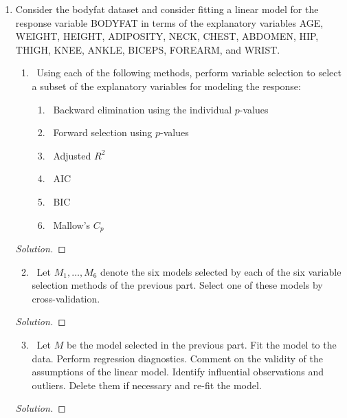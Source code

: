 \documentclass[12pt]{article}
\begin{document}
\begin{enumerate}[leftmargin=0cm,itemindent=.5cm,labelwidth=\itemindent,labelsep=0cm,align=left]

\item Consider the bodyfat dataset and consider fitting a linear model for the response variable BODYFAT in terms of the explanatory variables AGE, WEIGHT, HEIGHT, ADIPOSITY, NECK, CHEST, ABDOMEN, HIP, THIGH, KNEE, ANKLE, BICEPS, FOREARM, and WRIST.
\begin{enumerate}
\item \ Using each of the following methods, perform variable selection to select a subset of the explanatory variables for modeling the response:
\begin{enumerate}
\item \ Backward elimination using the individual $p$-values
\item \ Forward selection using $p$-values
\item \ Adjusted $R^2$
\item \ AIC
\item \ BIC
\item \ Mallow's $C_p$
\end{enumerate}
\end{enumerate}





\begin{proof}[Solution]



\end{proof}







\begin{enumerate}
\setcounter{enumii}{1}
\item \ Let $M_1, \dots , M_6$ denote the six models selected by each of the six variable selection methods of the previous part.  Select one of these models by cross-validation.
\end{enumerate}


\begin{proof}[Solution]

\end{proof}



\begin{enumerate}
\setcounter{enumii}{2}
\item \ Let $M$ be the model selected in the previous part.  Fit the model to the data.  Perform regression diagnostics.  Comment on the validity of the assumptions of the linear model.  Identify influential observations and outliers.  Delete them if necessary and re-fit the model.
\end{enumerate}



\begin{proof}[Solution]

\end{proof}



\end{enumerate}
\end{document}
